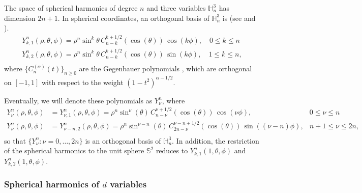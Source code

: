\documentclass[a4paper]{article}
\theoremstyle{plain}
\theoremstyle{definition}
\begin{document}
    The space of spherical harmonics of degree $n$ and three variables $\mathbb H_n^3$ has dimension $2n+1$. In spherical coordinates, an orthogonal basis of $\mathbb H^3_n$ is (see \cite[Equation~1.6.5]{FX13} and \cite[Theorem 4.1.4]{DX14}).
    \begin{equation}
    \label{eq:sph-harmonics}
        \begin{aligned}
        Y_{k,1}^n(\rho,\theta,\phi)=\rho^n \sin^k\theta \, C_{n-k}^{k+1/2}(\cos(\theta))\,\cos (k\phi),\quad 0\leq k \leq n \\
        Y_{k,2}^n(\rho,\theta,\phi)=\rho^n \sin^k\theta \, C_{n-k}^{k+1/2}(\cos(\theta))\,\sin (k\phi),\quad 1\leq k \leq n, \\
        \end{aligned}
    \end{equation}
    where $\{C_n^{(\alpha)}(t)\}_{n\geq 0}$ are the Gegenbauer polynomials \cite[Section 4.7]{Sze59}, which are orthogonal on $[-1,1]$ with respect to the weight $(1-t^2)^{\alpha-1/2}$.
    
    Eventually, we will denote these polynomials as $Y^n_\nu$, where
    \begin{equation}
        \label{eq:sph-harmonics-nu}
        \begin{aligned}
        Y_{\nu}^n(\rho,\theta,\phi) &=Y_{\nu,1}^n(\rho,\theta,\phi)=\rho^n \sin^\nu(\theta) \, C_{n-\nu}^{\nu+1/2}(\cos(\theta))\,\cos(\nu\phi), & 0\leq \nu \leq n \\
        Y_{\nu}^n(\rho,\theta,\phi) &=Y_{\nu-n,2}^n(\rho,\theta,\phi)=\rho^n \sin^{\nu-n}(\theta) \, C_{2n-\nu}^{\nu-n+1/2}(\cos(\theta))\,\sin((\nu-n)\phi), & n+1\leq \nu \leq 2n, \\
        \end{aligned}
    \end{equation}
    so that $\{Y_\nu^n:\nu=0,\dots,2n\}$ is an orthogonal basis of $\mathbb H_n^3$. In addition, the restriction of the spherical harmonics to the unit sphere $\mathbb S^2$ reduces to $ Y_{k,1}^n(1,\theta,\phi)$ and $ Y_{k,2}^n(1,\theta,\phi)$.

    \subsubsection{Spherical harmonics of $d$ variables}\label{subsubsec:sph-harm-d}
\end{document}
